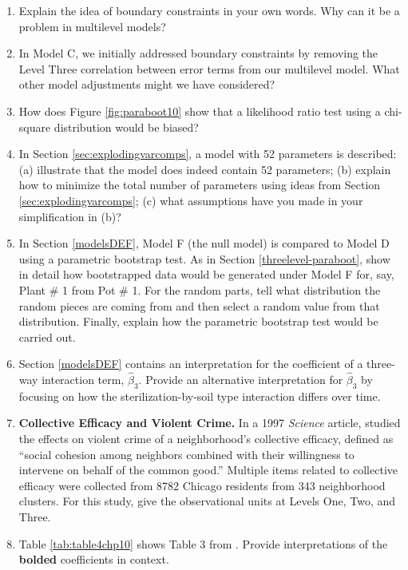 \documentclass[
]{krantz}
\begin{document}
\begin{enumerate}
\item
  Explain the idea of boundary constraints in your own words. Why can it be a problem in multilevel models?
\item
  In Model C, we initially addressed boundary constraints by removing the Level Three correlation between error terms from our multilevel model. What other model adjustments might we have considered?
\item
  How does Figure \ref{fig:paraboot10} show that a likelihood ratio test using a chi-square distribution would be biased?
\item
  In Section \ref{sec:explodingvarcomps}, a model with 52 parameters is described: (a) illustrate that the model does indeed contain 52 parameters; (b) explain how to minimize the total number of parameters using ideas from Section \ref{sec:explodingvarcomps}; (c) what assumptions have you made in your simplification in (b)?
\item
  In Section \ref{modelsDEF}, Model F (the null model) is compared to Model D using a parametric bootstrap test. As in Section \ref{threelevel-paraboot}, show in detail how bootstrapped data would be generated under Model F for, say, Plant \# 1 from Pot \# 1. For the random parts, tell what distribution the random pieces are coming from and then select a random value from that distribution. Finally, explain how the parametric bootstrap test would be carried out.
\item
  Section \ref{modelsDEF} contains an interpretation for the coefficient of a three-way interaction term, \(\hat{\beta}_{3}\). Provide an alternative interpretation for \(\hat{\beta}_{3}\) by focusing on how the sterilization-by-soil type interaction differs over time.
\item
  \textbf{Collective Efficacy and Violent Crime.} In a 1997 \emph{Science} article, \citet{Sampson1997} studied the effects on violent crime of a neighborhood's collective efficacy, defined as ``social cohesion among neighbors combined with their willingness to intervene on behalf of the common good.'' Multiple items related to collective efficacy were collected from 8782 Chicago residents from 343 neighborhood clusters. For this study, give the observational units at Levels One, Two, and Three.
\item
  Table \ref{tab:table4chp10} shows Table 3 from \citet{Sampson1997}. Provide interpretations of the \textbf{bolded} coefficients in context.
\end{enumerate}
\end{document}
